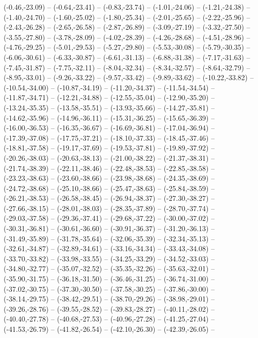 {  (-0.46,-23.09) -- (-0.64,-23.41) -- (-0.83,-23.74) -- (-1.01,-24.06) -- (-1.21,-24.38) -- (-1.40,-24.70) -- (-1.60,-25.02) --
  (-1.80,-25.34) -- (-2.01,-25.65) -- (-2.22,-25.96) -- (-2.43,-26.28) -- (-2.65,-26.58) -- (-2.87,-26.89) -- (-3.09,-27.19) --
  (-3.32,-27.50) -- (-3.55,-27.80) -- (-3.78,-28.09) -- (-4.02,-28.39) -- (-4.26,-28.68) -- (-4.51,-28.96) -- (-4.76,-29.25) --
  (-5.01,-29.53) -- (-5.27,-29.80) -- (-5.53,-30.08) -- (-5.79,-30.35) -- (-6.06,-30.61) -- (-6.33,-30.87) -- (-6.61,-31.13) --
  (-6.88,-31.38) -- (-7.17,-31.63) -- (-7.45,-31.87) -- (-7.75,-32.11) -- (-8.04,-32.34) -- (-8.34,-32.57) -- (-8.64,-32.79) --
  (-8.95,-33.01) -- (-9.26,-33.22) -- (-9.57,-33.42) -- (-9.89,-33.62) -- (-10.22,-33.82) -- (-10.54,-34.00) -- (-10.87,-34.19) --
  (-11.20,-34.37) -- (-11.54,-34.54) -- (-11.87,-34.71) -- (-12.21,-34.88) -- (-12.55,-35.04) -- (-12.90,-35.20) -- (-13.24,-35.35) --
  (-13.58,-35.51) -- (-13.93,-35.66) -- (-14.27,-35.81) -- (-14.62,-35.96) -- (-14.96,-36.11) -- (-15.31,-36.25) -- (-15.65,-36.39) --
  (-16.00,-36.53) -- (-16.35,-36.67) -- (-16.69,-36.81) -- (-17.04,-36.94) -- (-17.39,-37.08) -- (-17.75,-37.21) -- (-18.10,-37.33) --
  (-18.45,-37.46) -- (-18.81,-37.58) -- (-19.17,-37.69) -- (-19.53,-37.81) -- (-19.89,-37.92) -- (-20.26,-38.03) -- (-20.63,-38.13) --
  (-21.00,-38.22) -- (-21.37,-38.31) -- (-21.74,-38.39) -- (-22.11,-38.46) -- (-22.48,-38.53) -- (-22.85,-38.58) -- (-23.23,-38.63) --
  (-23.60,-38.66) -- (-23.98,-38.68) -- (-24.35,-38.69) -- (-24.72,-38.68) -- (-25.10,-38.66) -- (-25.47,-38.63) -- (-25.84,-38.59) --
  (-26.21,-38.53) -- (-26.58,-38.45) -- (-26.94,-38.37) -- (-27.30,-38.27) -- (-27.66,-38.15) -- (-28.01,-38.03) -- (-28.35,-37.89) --
  (-28.70,-37.74) -- (-29.03,-37.58) -- (-29.36,-37.41) -- (-29.68,-37.22) -- (-30.00,-37.02) -- (-30.31,-36.81) -- (-30.61,-36.60) --
  (-30.91,-36.37) -- (-31.20,-36.13) -- (-31.49,-35.89) -- (-31.78,-35.64) -- (-32.06,-35.39) -- (-32.34,-35.13) -- (-32.61,-34.87) --
  (-32.89,-34.61) -- (-33.16,-34.34) -- (-33.43,-34.08) -- (-33.70,-33.82) -- (-33.98,-33.55) -- (-34.25,-33.29) -- (-34.52,-33.03) --
  (-34.80,-32.77) -- (-35.07,-32.52) -- (-35.35,-32.26) -- (-35.63,-32.01) -- (-35.90,-31.75) -- (-36.18,-31.50) -- (-36.46,-31.25) --
  (-36.74,-31.00) -- (-37.02,-30.75) -- (-37.30,-30.50) -- (-37.58,-30.25) -- (-37.86,-30.00) -- (-38.14,-29.75) -- (-38.42,-29.51) --
  (-38.70,-29.26) -- (-38.98,-29.01) -- (-39.26,-28.76) -- (-39.55,-28.52) -- (-39.83,-28.27) -- (-40.11,-28.02) -- (-40.40,-27.78) --
  (-40.68,-27.53) -- (-40.96,-27.28) -- (-41.25,-27.04) -- (-41.53,-26.79) -- (-41.82,-26.54) -- (-42.10,-26.30) -- (-42.39,-26.05) --
}
